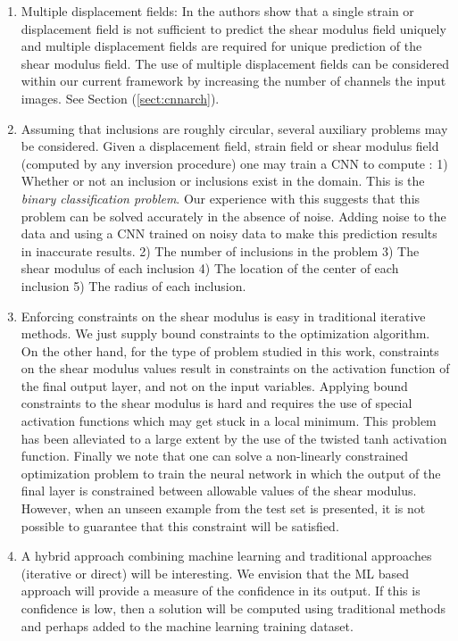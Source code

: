 \documentclass[12pt]{article}
\begin{document}
\begin{enumerate}
\item{Multiple displacement fields: In \cite{paper:barbonegokhale,paper:barbonebamber} the authors show that a single strain or displacement field is not sufficient to predict the shear modulus field uniquely and multiple displacement fields are required for unique prediction of the shear modulus field. The use of multiple displacement fields can be considered within our current framework by increasing the number of channels the input images. See Section (\ref{sect:cnnarch}).} 
\item{Assuming that inclusions are roughly circular, several auxiliary problems may be considered. Given a displacement field, strain field or shear modulus field (computed by any inversion procedure) one may train a CNN to compute : 1) Whether or not an inclusion or inclusions exist  in the domain. This is the \textit{binary classification problem}. Our experience with this suggests that this problem can be solved accurately in the absence of noise.  Adding noise to the data and using a CNN trained on noisy data to make this prediction results in inaccurate results. 2) The number of inclusions in the problem 3) The shear modulus of each inclusion 4) The location of the center of each inclusion 5) The radius of each inclusion.}
\item{Enforcing constraints on the shear modulus is easy in traditional iterative methods. We just supply bound constraints to the optimization algorithm. On the other hand, for the type of problem studied in this work, constraints on the shear modulus values result in constraints on the activation function of the final output layer, and not on the input variables. Applying bound constraints to the shear modulus is hard and requires the use of special activation functions which may get stuck in a local minimum. This problem has been alleviated to a large extent by the use of the twisted tanh activation function. Finally we note that one can solve a non-linearly constrained optimization problem to train the neural network in which the output of the final layer is constrained between allowable values of the shear modulus. However, when an unseen example from the test set is presented, it is not possible to guarantee that this constraint will be satisfied.}
\item{A hybrid approach combining machine learning and traditional approaches (iterative or direct) will be interesting. We envision that the ML based approach will provide a measure of the confidence in its output. If this is confidence is low, then a solution will be computed using traditional methods and perhaps added to the machine learning training dataset.}

\end{enumerate}
\end{document}
